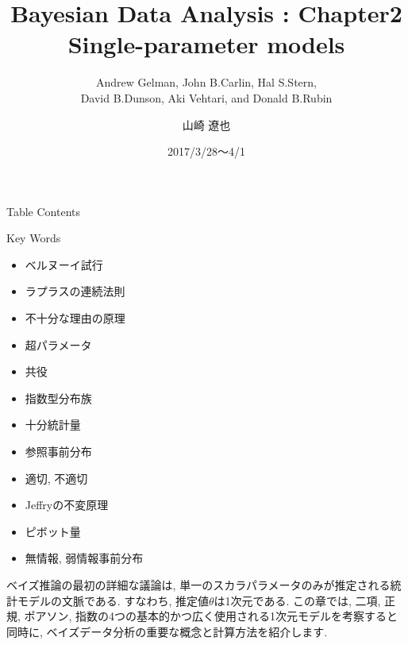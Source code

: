 \documentclass[10pt,dvipdfmx,a4]{beamer}
\title{Bayesian Data Analysis : Chapter2 \\Single-parameter models}
\subtitle{Andrew Gelman, John B.Carlin, Hal S.Stern,\\David B.Dunson, Aki Vehtari, and Donald B.Rubin}
\author{山崎 遼也}
\institute{情報学科 数理工学コース 4回}
\date{2017/3/28～4/1}
\begin{document}
\frame{\titlepage}

\begin{frame}{Table Contents}
\begin{multicols}{2}
{\scriptsize \tableofcontents}
\end{multicols}
\end{frame}

\begin{frame}{Key Words}
\begin{multicols}{2}
{\scriptsize \begin{itemize}
\item ベルヌーイ試行
\item ラプラスの連続法則
\item 不十分な理由の原理
\item 超パラメータ
\item 共役
\item 指数型分布族
\item 十分統計量
\item 参照事前分布
\item 適切, 不適切
\item Jeffryの不変原理
\item ピボット量
\item 無情報, 弱情報事前分布
\end{itemize}}
\end{multicols}
\end{frame}


\begin{frame}
ベイズ推論の最初の詳細な議論は, 単一のスカラパラメータのみが推定される統計モデルの文脈である.
すなわち, 推定値$\theta$は1次元である.
この章では, 二項, 正規, ポアソン, 指数の4つの基本的かつ広く使用される1次元モデルを考察すると同時に, ベイズデータ分析の重要な概念と計算方法を紹介します.
\end{frame}

\end{document}
